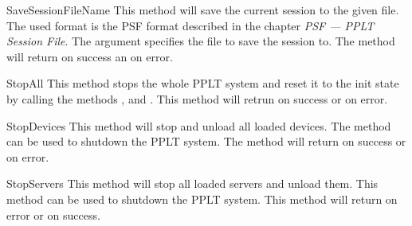 \begin{methoddesc}[System]{SaveSession}{FileName}
This method will save the current session to the given file. The used
format is the PSF format described in the chapter 
\emph{PSF --- PPLT Session File}. The argument  specifies
the file to save the session to. The method will return  on 
success an  on error.
\end{methoddesc}


\begin{methoddesc}[System]{StopAll}{}
This method stops the whole PPLT system and reset it to the init state by calling  the 
methods ,  and
. This method will retrun  on success or
 on error.
\end{methoddesc}


\begin{methoddesc}[System]{StopDevices}{}
This method will stop and unload all loaded devices. The method can be used to
shutdown the PPLT system. The method will return  on success or 
 on error.
\end{methoddesc}


\begin{methoddesc}[System]{StopServers}{}
This method will stop all loaded servers and unload them. This method can be used 
to shutdown the PPLT system. This method will return  on error or 
 on success.
\end{methoddesc}

